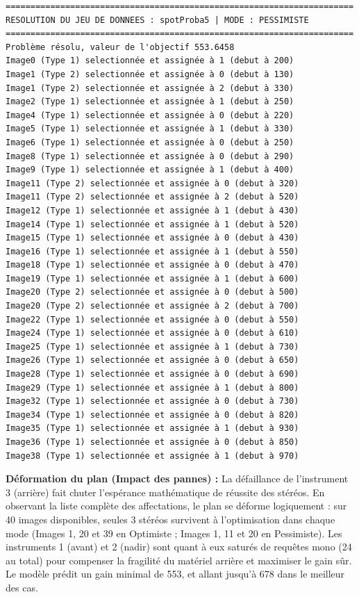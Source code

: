 \documentclass[8pt]{article}
\begin{document}
\begin{verbatim}
======================================================================
RESOLUTION DU JEU DE DONNEES : spotProba5 | MODE : PESSIMISTE
======================================================================
Problème résolu, valeur de l'objectif 553.6458
Image0 (Type 1) selectionnée et assignée à 1 (debut à 200)
Image1 (Type 2) selectionnée et assignée à 0 (debut à 130)
Image1 (Type 2) selectionnée et assignée à 2 (debut à 330)
Image2 (Type 1) selectionnée et assignée à 1 (debut à 250)
Image4 (Type 1) selectionnée et assignée à 0 (debut à 220)
Image5 (Type 1) selectionnée et assignée à 1 (debut à 330)
Image6 (Type 1) selectionnée et assignée à 0 (debut à 250)
Image8 (Type 1) selectionnée et assignée à 0 (debut à 290)
Image9 (Type 1) selectionnée et assignée à 1 (debut à 400)
Image11 (Type 2) selectionnée et assignée à 0 (debut à 320)
Image11 (Type 2) selectionnée et assignée à 2 (debut à 520)
Image12 (Type 1) selectionnée et assignée à 1 (debut à 430)
Image14 (Type 1) selectionnée et assignée à 1 (debut à 520)
Image15 (Type 1) selectionnée et assignée à 0 (debut à 430)
Image16 (Type 1) selectionnée et assignée à 1 (debut à 550)
Image18 (Type 1) selectionnée et assignée à 0 (debut à 470)
Image19 (Type 1) selectionnée et assignée à 1 (debut à 600)
Image20 (Type 2) selectionnée et assignée à 0 (debut à 500)
Image20 (Type 2) selectionnée et assignée à 2 (debut à 700)
Image22 (Type 1) selectionnée et assignée à 0 (debut à 550)
Image24 (Type 1) selectionnée et assignée à 0 (debut à 610)
Image25 (Type 1) selectionnée et assignée à 1 (debut à 730)
Image26 (Type 1) selectionnée et assignée à 0 (debut à 650)
Image28 (Type 1) selectionnée et assignée à 0 (debut à 690)
Image29 (Type 1) selectionnée et assignée à 1 (debut à 800)
Image32 (Type 1) selectionnée et assignée à 0 (debut à 730)
Image34 (Type 1) selectionnée et assignée à 0 (debut à 820)
Image35 (Type 1) selectionnée et assignée à 1 (debut à 930)
Image36 (Type 1) selectionnée et assignée à 0 (debut à 850)
Image38 (Type 1) selectionnée et assignée à 1 (debut à 970)
\end{verbatim}

\textbf{Déformation du plan (Impact des pannes) :}
La défaillance de l'instrument 3 (arrière) fait chuter l'espérance mathématique de réussite des stéréos. En observant la liste complète des affectations, le plan se déforme logiquement : sur 40 images disponibles, seules 3 stéréos survivent à l'optimisation dans chaque mode (Images 1, 20 et 39 en Optimiste ; Images 1, 11 et 20 en Pessimiste). Les instruments 1 (avant) et 2 (nadir) sont quant à eux saturés de requêtes mono (24 au total) pour compenser la fragilité du matériel arrière et maximiser le gain sûr. Le modèle prédit un gain minimal de 553, et allant jusqu'à 678 dans le meilleur des cas.
\end{document}
